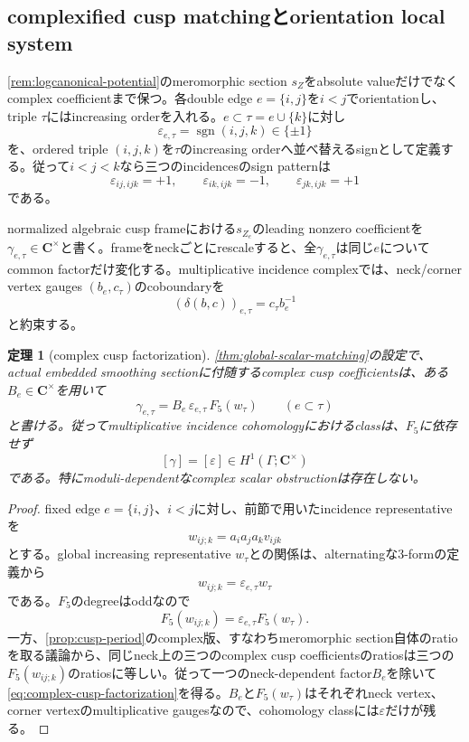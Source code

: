 \documentclass[11pt,a4paper]{ltjsarticle}
\newtheorem{theorem}{定理}[section]
\theoremstyle{definition}
\theoremstyle{remark}
\newcommand{\CC}{\mathbf C}
\begin{document}
\subsection{complexified cusp matchingとorientation local system}
\label{subsec:complex-phase-matching}

\cref{rem:logcanonical-potential}のmeromorphic section $s_Z$をabsolute valueだけでなくcomplex coefficientまで保つ。各double edge $e=\{i,j\}$を$i<j$でorientationし、triple $\tau$にはincreasing orderを入れる。$e\subset\tau=e\cup\{k\}$に対し
\begin{equation}\label{eq:orientation-sign}
 \varepsilon_{e,\tau}
 =\operatorname{sgn}(i,j,k)\in\{\pm1\}
\end{equation}
を、ordered triple $(i,j,k)$を$\tau$のincreasing orderへ並べ替えるsignとして定義する。従って$i<j<k$なら三つのincidencesのsign patternは
\[
 \varepsilon_{ij,ijk}=+1,
 \qquad
 \varepsilon_{ik,ijk}=-1,
 \qquad
 \varepsilon_{jk,ijk}=+1
\]
である。

normalized algebraic cusp frameにおける$s_{Z_e}$のleading nonzero coefficientを$\gamma_{e,\tau}\in\CC^\times$と書く。frameをneckごとにrescaleすると、全$\gamma_{e,\tau}$は同じ$e$についてcommon factorだけ変化する。multiplicative incidence complexでは、neck/corner vertex gauges $(b_e,c_\tau)$のcoboundaryを
\[
 (\delta(b,c))_{e,\tau}=c_\tau b_e^{-1}
\]
と約束する。

\begin{theorem}[complex cusp factorization]\label{thm:complex-cusp-factorization}
\cref{thm:global-scalar-matching}の設定で、actual embedded smoothing sectionに付随するcomplex cusp coefficientsは、ある$B_e\in\CC^\times$を用いて
\begin{equation}\label{eq:complex-cusp-factorization}
 \boxed{
 \gamma_{e,\tau}
 =B_e\,\varepsilon_{e,\tau}\,F_5(w_\tau)
 }
 \qquad(e\subset\tau)
\end{equation}
と書ける。従ってmultiplicative incidence cohomologyにおけるclassは、$F_5$に依存せず
\begin{equation}\label{eq:phase-class-epsilon}
 [\gamma]=[\varepsilon]
 \in H^1(\Gamma;\CC^\times)
\end{equation}
である。特にmoduli-dependentなcomplex scalar obstructionは存在しない。
\end{theorem}

\begin{proof}
fixed edge $e=\{i,j\}$、$i<j$に対し、前節で用いたincidence representativeを
\[
 w_{ij;k}=a_ia_ja_kv_{ijk}
\]
とする。global increasing representative $w_\tau$との関係は、alternatingな$3$-formの定義から
\[
 w_{ij;k}=\varepsilon_{e,\tau}w_\tau
\]
である。$F_5$のdegreeはoddなので
\[
 F_5(w_{ij;k})=\varepsilon_{e,\tau}F_5(w_\tau).
\]
一方、\cref{prop:cusp-period}のcomplex版、すなわちmeromorphic section自体のratioを取る議論から、同じneck上の三つのcomplex cusp coefficientsのratiosは三つの$F_5(w_{ij;k})$のratiosに等しい。従って一つのneck-dependent factor$B_e$を除いて\eqref{eq:complex-cusp-factorization}を得る。$B_e$と$F_5(w_\tau)$はそれぞれneck vertex、corner vertexのmultiplicative gaugesなので、cohomology classには$\varepsilon$だけが残る。
\end{proof}
\end{document}

